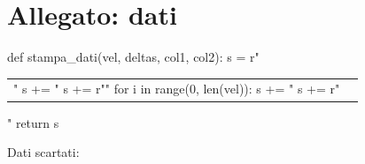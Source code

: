 \section{Allegato: dati}
\begin{sagesilent}
def stampa_dati(vel, deltas, col1, col2):
  s = r"\begin{tabular}{c|c}"
  s += "%
  s += r"\midrule"
  for i in range(0, len(vel)):
    s += "%
  s += r"\end{tabular}"
  return s
\end{sagesilent}

\begin{center}
\end{center}
Dati scartati:
\begin{center}
\end{center}
